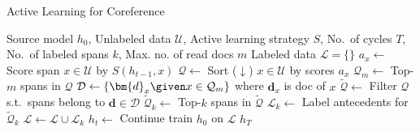 \begin{algorithm}[t]
\caption{Active Learning for Coreference}
\begin{algorithmic}[1]
    \Require Source model $h_0$, Unlabeled data $\mathcal{U}$,
    Active learning strategy $S$,
    No.~of cycles $T$,
    No.~of labeled spans $k$, Max. no. of read docs $m$
    \State Labeled data $\mathcal{L}=\{\}$
        \State $a_x \gets$ Score span $x \in \mathcal{U}$ by $S(h_{t-1}, x)$
        \State $\mathcal{Q} \gets$ Sort ($\downarrow$) $x \in \mathcal{U}$ by scores $a_x$
        \State $\mathcal{Q}_m \gets$ Top-$m$ spans in $\mathcal{Q}$
        \State $\mathcal{D} \gets \{\bm{d}_x \given x \in \mathcal{Q}_m \}$ where
        $\bm{d}_x$ is doc of $x$
        \State $\widetilde{\mathcal{Q}} \gets$ Filter $\mathcal{Q}$ s.t.~spans belong to
        $\bm{d} \in \mathcal{D}$
        \State $\widetilde{\mathcal{Q}}_k \gets$ Top-$k$ spans in
        $\widetilde{\mathcal{Q}}$
        \State $\mathcal{L}_k \gets$ Label antecedents for
        $\widetilde{\mathcal{Q}}_k$
        \State $\mathcal{L} \gets \mathcal{L} \cup \mathcal{L}_k$
        \State $h_t \gets$ Continue train $h_0$ on $\mathcal{L}$
    \EndFor
    \Return $h_T$
\end{algorithmic}
\label{alg:active}
\end{algorithm}
